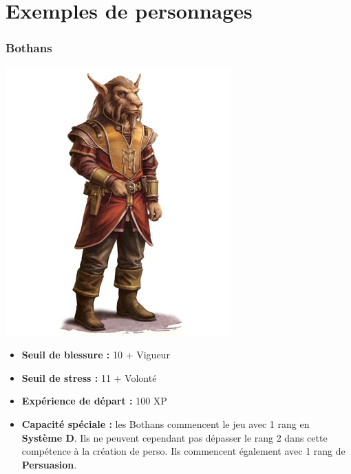 \documentclass{article}
\begin{document}
\part*{Exemples de personnages}

\section*{Bothans}
\noindent\begin{minipage}{0.3\textwidth}
	\includegraphics[width=1\linewidth]{../_img/species/bothan}
\end{minipage}
\hfill
\begin{minipage}{0.7\textwidth}\raggedleft
	\begin{itemize}
		\item \textbf{Seuil de blessure :} 10 + Vigueur 
		\item \textbf{Seuil de stress :} 11 + Volonté 
		\item \textbf{Expérience de départ :} 100 XP
		\item \textbf{Capacité spéciale :} les Bothans commencent le jeu avec 1 rang en \textbf{Système D}. Ils ne peuvent cependant pas dépasser le rang 2 dans cette compétence à la création de perso. Ils commencent également avec 1 rang de \textbf{Persuasion}.
	\end{itemize}
\end{minipage}
\end{document}
